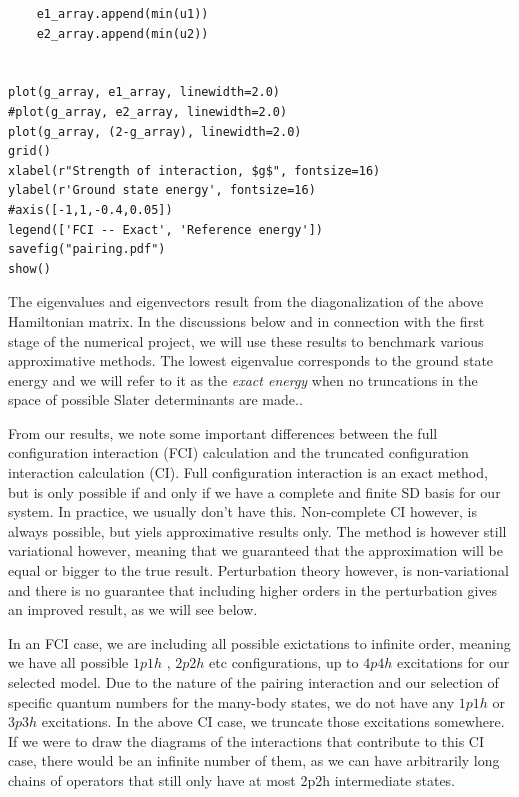 \documentclass[%
twoside,                 %
final,                   %
10pt]{article}
\newenvironment{doconceexercise}{}{}
\begin{document}
\begin{doconceexercise}
\begin{verbatim}
	e1_array.append(min(u1))
	e2_array.append(min(u2))


plot(g_array, e1_array, linewidth=2.0)
#plot(g_array, e2_array, linewidth=2.0)
plot(g_array, (2-g_array), linewidth=2.0)
grid()
xlabel(r"Strength of interaction, $g$", fontsize=16)
ylabel(r'Ground state energy', fontsize=16)
#axis([-1,1,-0.4,0.05])
legend(['FCI -- Exact', 'Reference energy'])
savefig("pairing.pdf")
show()
\end{verbatim}
The eigenvalues and eigenvectors result from the diagonalization of the above Hamiltonian matrix.
In the discussions below and in connection with the first stage of the numerical project, we will use these results to benchmark various approximative methods. 
The lowest eigenvalue corresponds to the ground state
energy and we will refer to it as the \emph{exact energy} when no truncations in the space of possible Slater determinants are made..

From our results, we note some important differences between the full configuration interaction (FCI)
calculation and the truncated configuration interaction calculation (CI).
Full configuration interaction is an exact method, but is only
possible if and only if we have a complete and finite SD basis for our
system. In practice, we usually don't have this. Non-complete
CI however, is always possible, but yiels   approximative
results only. The method is however still variational however, meaning that we 
guaranteed that the approximation will be equal or bigger to the true
result. 
Perturbation theory however, is non-variational and there is no guarantee that including higher orders in the 
perturbation gives an improved result, as we will see below.

In an FCI case, we are including all possible exictations to infinite
order, meaning we have all possible $1p1h$ , $2p2h$ etc configurations, up to $4p4h$ 
excitations for our selected model. Due to the nature of the pairing interaction and our selection
of specific quantum numbers for the many-body states, we do not have any $1p1h$ or $3p3h$ excitations.
In the above CI case, we truncate those excitations somewhere. 
If we
were to draw the diagrams of the interactions that contribute to this
CI case, there would be an infinite number of them, as we can have
arbitrarily long chains of operators that still only have at most 2p2h
intermediate states.



\end{doconceexercise}
\end{document}
